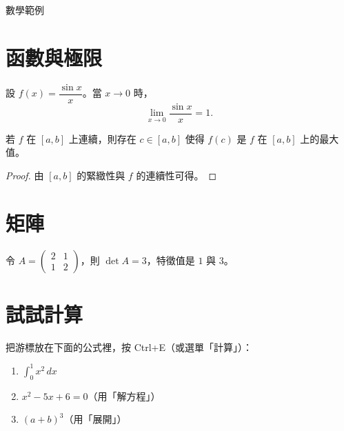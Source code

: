 
\begin{center}{\Large 數學範例}\end{center}

\section{函數與極限}
設 $f(x)=\dfrac{\sin x}{x}$。當 $x\to 0$ 時，
\[\lim_{x\to 0}\frac{\sin x}{x}=1.\]

\begin{theorem}
若 $f$ 在 $[a,b]$ 上連續，則存在 $c\in[a,b]$ 使得 $f(c)$ 是 $f$ 在 $[a,b]$ 上的最大值。
\end{theorem}

\begin{proof}
由 $[a,b]$ 的緊緻性與 $f$ 的連續性可得。
\end{proof}

\section{矩陣}
令 $A=\begin{pmatrix}2&1\\1&2\end{pmatrix}$，則 $\det A=3$，特徵值是 $1$ 與 $3$。

\section{試試計算}
把游標放在下面的公式裡，按 Ctrl+E（或選單「計算」）：
\begin{enumerate}
\item $\int_0^1 x^2\,dx$
\item $x^2-5x+6=0$（用「解方程」）
\item $(a+b)^3$（用「展開」）
\end{enumerate}

